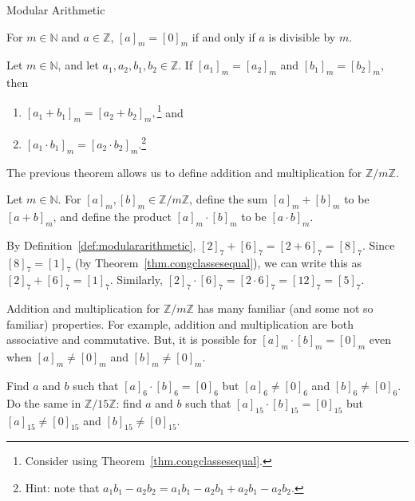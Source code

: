 \begin{section}{Modular Arithmetic}
\begin{theorem}\label{thm.divisibleiffzeromod}
For  $m\in \mathbb{N}$ and $a\in \mathbb{Z}$, $[a]_m = [0]_m$ if and only if $a$ is divisible by $m$.
\end{theorem}

\begin{theorem}
Let $m\in \mathbb{N}$, and let $a_1,a_2,b_1,b_2 \in \mathbb{Z}$. If $[a_1]_m = [a_2]_m$ and $[b_1]_m = [b_2]_m$, then 
\begin{enumerate}[label=\textrm{(\alph*)}]
\item $[a_1+b_1]_m = [a_2+b_2]_m,$\footnote{Consider using Theorem~\ref{thm.congclassesequal}.} and
\item $[a_1\cdot b_1]_m = [a_2\cdot b_2]_m$.\footnote{Hint: note that $a_1b_1-a_2b_2 = a_1b_1 -a_2b_1 + a_2b_1-a_2b_2$.}
\end{enumerate}
\end{theorem}

The previous theorem allows us to define addition and multiplication for $\mathbb{Z}/m\mathbb{Z}$. 

\begin{definition}\label{def:modulararithmetic}
Let $m\in \mathbb{N}$. For $[a]_m, [b]_m \in \mathbb{Z}/m\mathbb{Z}$, define the sum $[a]_m + [b]_m$ to be $[a+b]_m$, and define the product $[a]_m \cdot [b]_m$ to be $ [a\cdot b]_m$.
\end{definition}

\begin{example}
By Definition~\ref{def:modulararithmetic}, $[2]_7+[6]_7 = [2+6]_7 = [8]_7$. Since $[8]_7 = [1]_7$ (by Theorem~\ref{thm.congclassesequal}), we can write this as $[2]_7+[6]_7 = [1]_7$. Similarly, $[2]_7\cdot[6]_7 = [2\cdot6]_7 = [12]_7 = [5]_7$.
\end{example}

\begin{remark}
Addition and multiplication for $\mathbb{Z}/m\mathbb{Z}$ has many familiar (and some not so familiar) properties. For example, addition and multiplication are both associative and commutative. But, it is possible for $[a]_m\cdot[b]_m = [0]_m$ even when $[a]_m \neq [0]_m$ and $[b]_m \neq [0]_m$.
\end{remark}

\begin{exercise}
Find $a$ and $b$ such that $[a]_6\cdot[b]_6 = [0]_6$ but $[a]_6 \neq [0]_6$ and $[b]_6 \neq [0]_6$. Do the same in $\mathbb{Z}/15\mathbb{Z}$: find $a$ and $b$ such that $[a]_{15}\cdot[b]_{15} = [0]_{15}$ but $[a]_{15} \neq [0]_{15}$ and $[b]_{15} \neq [0]_{15}$.
\end{exercise}


\end{section}

